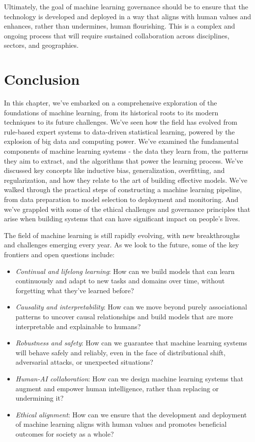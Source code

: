 \documentclass[
  9pt,
  letterpaper,
  abstract,
  titlepage]{scrbook}
\begin{document}
Ultimately, the goal of machine learning governance should be to ensure
that the technology is developed and deployed in a way that aligns with
human values and enhances, rather than undermines, human flourishing.
This is a complex and ongoing process that will require sustained
collaboration across disciplines, sectors, and geographies.

\section{Conclusion}\label{conclusion}

In this chapter, we've embarked on a comprehensive exploration of the
foundations of machine learning, from its historical roots to its modern
techniques to its future challenges. We've seen how the field has
evolved from rule-based expert systems to data-driven statistical
learning, powered by the explosion of big data and computing power.
We've examined the fundamental components of machine learning systems -
the data they learn from, the patterns they aim to extract, and the
algorithms that power the learning process. We've discussed key concepts
like inductive bias, generalization, overfitting, and regularization,
and how they relate to the art of building effective models. We've
walked through the practical steps of constructing a machine learning
pipeline, from data preparation to model selection to deployment and
monitoring. And we've grappled with some of the ethical challenges and
governance principles that arise when building systems that can have
significant impact on people's lives.

The field of machine learning is still rapidly evolving, with new
breakthroughs and challenges emerging every year. As we look to the
future, some of the key frontiers and open questions include:

\begin{itemize}
\item
  \emph{Continual and lifelong learning}: How can we build models that
  can learn continuously and adapt to new tasks and domains over time,
  without forgetting what they've learned before?
\item
  \emph{Causality and interpretability}: How can we move beyond purely
  associational patterns to uncover causal relationships and build
  models that are more interpretable and explainable to humans?
\item
  \emph{Robustness and safety}: How can we guarantee that machine
  learning systems will behave safely and reliably, even in the face of
  distributional shift, adversarial attacks, or unexpected situations?
\item
  \emph{Human-AI collaboration}: How can we design machine learning
  systems that augment and empower human intelligence, rather than
  replacing or undermining it?
\item
  \emph{Ethical alignment}: How can we ensure that the development and
  deployment of machine learning aligns with human values and promotes
  beneficial outcomes for society as a whole?
\end{itemize}
\end{document}
